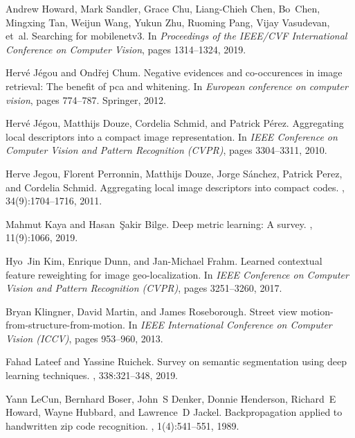 \documentclass{article}
\begin{document}
\begin{thebibliography}{99}
Andrew Howard, Mark Sandler, Grace Chu, Liang-Chieh Chen, Bo~Chen, Mingxing
  Tan, Weijun Wang, Yukun Zhu, Ruoming Pang, Vijay Vasudevan, et~al.
\newblock Searching for mobilenetv3.
\newblock In {\em Proceedings of the IEEE/CVF International Conference on
  Computer Vision}, pages 1314--1324, 2019.

Herv{\'e} J{\'e}gou and Ond{\v{r}}ej Chum.
\newblock Negative evidences and co-occurences in image retrieval: The benefit
  of pca and whitening.
\newblock In {\em European conference on computer vision}, pages 774--787.
  Springer, 2012.

Herv{\'e} J{\'e}gou, Matthijs Douze, Cordelia Schmid, and Patrick P{\'e}rez.
\newblock Aggregating local descriptors into a compact image representation.
\newblock In {\em IEEE Conference on Computer Vision and Pattern Recognition
  (CVPR)}, pages 3304--3311, 2010.

Herve Jegou, Florent Perronnin, Matthijs Douze, Jorge S{\'a}nchez, Patrick
  Perez, and Cordelia Schmid.
\newblock Aggregating local image descriptors into compact codes.
,
  34(9):1704--1716, 2011.

Mahmut Kaya and Hasan~{\c{S}}akir Bilge.
\newblock Deep metric learning: A survey.
, 11(9):1066, 2019.

Hyo~Jin Kim, Enrique Dunn, and Jan-Michael Frahm.
\newblock Learned contextual feature reweighting for image geo-localization.
\newblock In {\em IEEE Conference on Computer Vision and Pattern Recognition
  (CVPR)}, pages 3251--3260, 2017.

Bryan Klingner, David Martin, and James Roseborough.
\newblock Street view motion-from-structure-from-motion.
\newblock In {\em IEEE International Conference on Computer Vision (ICCV)},
  pages 953--960, 2013.

Fahad Lateef and Yassine Ruichek.
\newblock Survey on semantic segmentation using deep learning techniques.
, 338:321--348, 2019.

Yann LeCun, Bernhard Boser, John~S Denker, Donnie Henderson, Richard~E Howard,
  Wayne Hubbard, and Lawrence~D Jackel.
\newblock Backpropagation applied to handwritten zip code recognition.
, 1(4):541--551, 1989.


\end{thebibliography}
\end{document}
